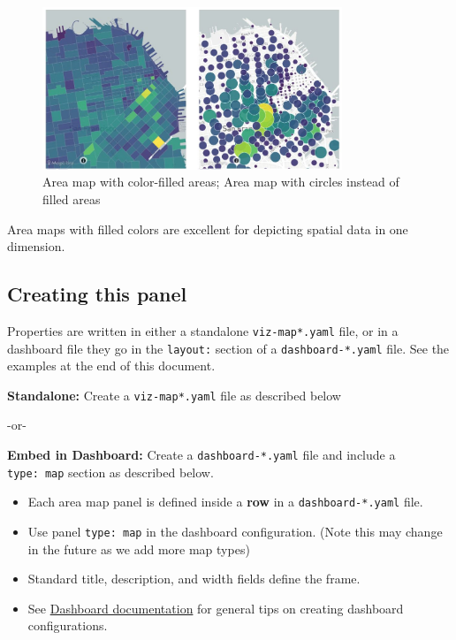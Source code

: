 \begin{figure}[H]
  \centering
  \includegraphics[width=0.8\textwidth]{assets/area-maps.jpg}
  \caption{Area map with color-filled areas; Area map with circles instead of filled areas}
\end{figure}

Area maps with filled colors are excellent for depicting spatial data in
one dimension.

\hypertarget{creating-this-panel}{%
\subsection{Creating this panel}\label{creating-this-panel}}

Properties are written in either a standalone \texttt{viz-map*.yaml}
file, or in a dashboard file they go in the \texttt{layout:} section of
a \texttt{dashboard-*.yaml} file. See the examples at the end of this
document.

\textbf{Standalone:} Create a \texttt{viz-map*.yaml} file as described
below

-or-

\textbf{Embed in Dashboard:} Create a \texttt{dashboard-*.yaml} file and
include a \texttt{type:\ map} section as described below.

\begin{itemize}
\tightlist
\item
  Each area map panel is defined inside a \textbf{row} in a
  \texttt{dashboard-*.yaml} file.
\item
  Use panel \texttt{type:\ map} in the dashboard configuration. (Note
  this may change in the future as we add more map types)
\item
  Standard title, description, and width fields define the frame.
\item
  See \href{dashboards}{Dashboard documentation} for general tips on
  creating dashboard configurations.
\end{itemize}

